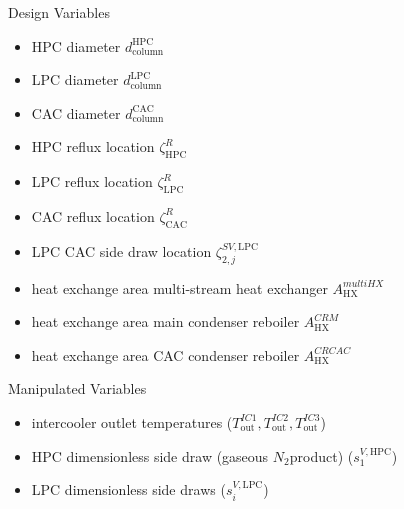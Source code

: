     Design Variables
    \begin{itemize}
        \item HPC diameter $d_{\text{column}}^{\text{HPC}}$
        \item LPC diameter $d_{\text{column}}^{\text{LPC}}$
        \item CAC diameter $d_{\text{column}}^{\text{CAC}}$
        \item HPC reflux location $\zeta^R_{\text{HPC}}$
        \item LPC reflux location $\zeta^R_{\text{LPC}}$
        \item CAC reflux location $\zeta^R_{\text{CAC}}$
        \item LPC CAC side draw location $\zeta^{SV,\text{LPC}}_{2,j}$
        \item heat exchange area multi-stream heat exchanger $A_{\text{HX}}^{multiHX}$
        \item heat exchange area main condenser reboiler $A_{\text{HX}}^{CRM}$
        \item heat exchange area CAC condenser reboiler $A_{\text{HX}}^{CRCAC}$
    \end{itemize}

    Manipulated Variables
    \begin{itemize}
        \item intercooler outlet temperatures ($T_{\text{out}}^{IC1}, T_{\text{out}}^{IC2}, T_{\text{out}}^{IC3}$)
        \item HPC dimensionless side draw (gaseous $N_2$product) ($s_1^{V, \text{HPC}}$)
        \item LPC dimensionless side draws ($s_i^{V, \text{LPC}}$)
    \end{itemize}
